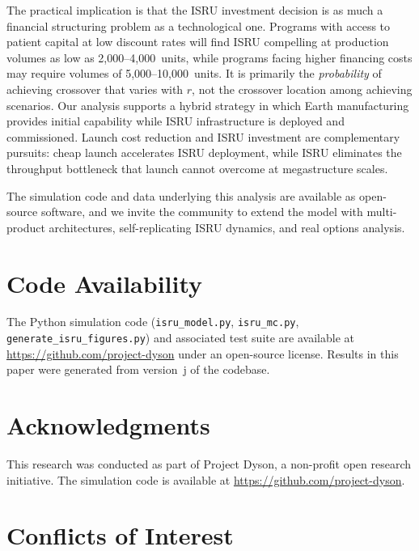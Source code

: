 \documentclass[preprint,12pt]{elsarticle}
\begin{document}
The practical implication is that the ISRU investment decision is as much a financial structuring problem as a technological one. Programs with access to patient capital at low discount rates will find ISRU compelling at production volumes as low as 2{,}000--4{,}000~units, while programs facing higher financing costs may require volumes of 5{,}000--10{,}000~units. It is primarily the \emph{probability} of achieving crossover that varies with $r$, not the crossover location among achieving scenarios. Our analysis supports a hybrid strategy in which Earth manufacturing provides initial capability while ISRU infrastructure is deployed and commissioned. Launch cost reduction and ISRU investment are complementary pursuits: cheap launch accelerates ISRU deployment, while ISRU eliminates the throughput bottleneck that launch cannot overcome at megastructure scales.

The simulation code and data underlying this analysis are available as open-source software, and we invite the community to extend the model with multi-product architectures, self-replicating ISRU dynamics, and real options analysis.

\section*{Code Availability}

The Python simulation code (\texttt{isru\_model.py}, \texttt{isru\_mc.py}, \texttt{generate\_isru\_figures.py}) and associated test suite are available at \url{https://github.com/project-dyson} under an open-source license. Results in this paper were generated from version~j of the codebase.


\section*{Acknowledgments}

This research was conducted as part of Project Dyson, a non-profit open research initiative. The simulation code is available at \url{https://github.com/project-dyson}.

\section*{Conflicts of Interest}
\end{document}

